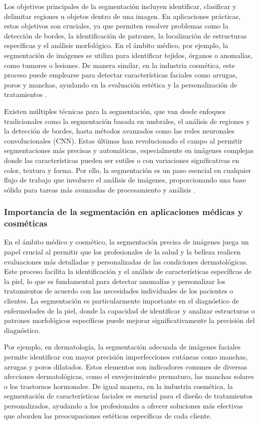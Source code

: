 Los objetivos principales de la segmentación incluyen identificar, clasificar y delimitar regiones u objetos dentro de una imagen. En aplicaciones prácticas, estos objetivos son cruciales, ya que permiten resolver problemas como la detección de bordes, la identificación de patrones, la localización de estructuras específicas y el análisis morfológico. En el ámbito médico, por ejemplo, la segmentación de imágenes se utiliza para identificar tejidos, órganos o anomalías, como tumores o lesiones. De manera similar, en la industria cosmética, este proceso puede emplearse para detectar características faciales como arrugas, poros y manchas, ayudando en la evaluación estética y la personalización de tratamientos \parencite{gonzalez2018}.

Existen múltiples técnicas para la segmentación, que van desde enfoques tradicionales como la segmentación basada en umbrales, el análisis de regiones y la detección de bordes, hasta métodos avanzados como las redes neuronales convolucionales (CNN). Estas últimas han revolucionado el campo al permitir segmentaciones más precisas y automáticas, especialmente en imágenes complejas donde las características pueden ser sutiles o con variaciones significativas en color, textura y forma. Por ello, la segmentación es un paso esencial en cualquier flujo de trabajo que involucre el análisis de imágenes, proporcionando una base sólida para tareas más avanzadas de procesamiento y análisis \parencite{gonzalez2018}.
\subsubsection{Importancia de la segmentación en aplicaciones médicas y cosméticas}
En el ámbito médico y cosmético, la segmentación precisa de imágenes juega un papel crucial al permitir que los profesionales de la salud y la belleza realicen evaluaciones más detalladas y personalizadas de las condiciones dermatológicas. Este proceso facilita la identificación y el análisis de características específicas de la piel, lo que es fundamental para detectar anomalías y personalizar los tratamientos de acuerdo con las necesidades individuales de los pacientes o clientes. La segmentación es particularmente importante en el diagnóstico de enfermedades de la piel, donde la capacidad de identificar y analizar estructuras o patrones morfológicos específicos puede mejorar significativamente la precisión del diagnóstico.

Por ejemplo, en dermatología, la segmentación adecuada de imágenes faciales permite identificar con mayor precisión imperfecciones cutáneas como manchas, arrugas y poros dilatados. Estos elementos son indicadores comunes de diversas afecciones dermatológicas, como el envejecimiento prematuro, las manchas solares o los trastornos hormonales. De igual manera, en la industria cosmética, la segmentación de características faciales es esencial para el diseño de tratamientos personalizados, ayudando a los profesionales a ofrecer soluciones más efectivas que aborden las preocupaciones estéticas específicas de cada cliente.

